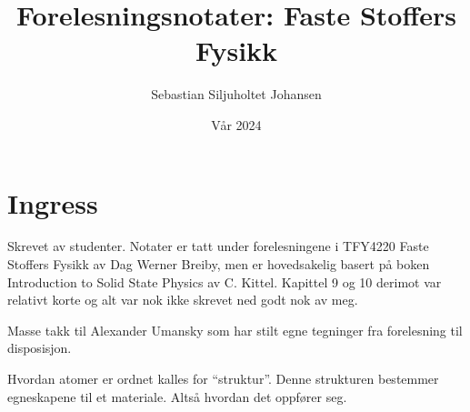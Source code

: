\documentclass{article}
\title{Forelesningsnotater: Faste Stoffers Fysikk}
\author{Sebastian Siljuholtet Johansen }
\date{Vår 2024}
\begin{document}
\maketitle

\nyside
\section*{Ingress}
Skrevet av studenter. Notater er tatt under forelesningene i TFY4220 Faste Stoffers Fysikk av Dag Werner Breiby, men er hovedsakelig basert på boken Introduction to Solid State Physics av C. Kittel. Kapittel 9 og 10 derimot var relativt korte og alt var nok ikke skrevet ned godt nok av meg.

Masse takk til Alexander Umansky som har stilt egne tegninger fra forelesning til disposisjon.
\nyside
\tableofcontents

\nyside
{}
Hvordan atomer er ordnet kalles for \enquote{struktur}. Denne strukturen bestemmer egneskapene til et materiale. Altså hvordan det oppfører seg.
\end{document}
